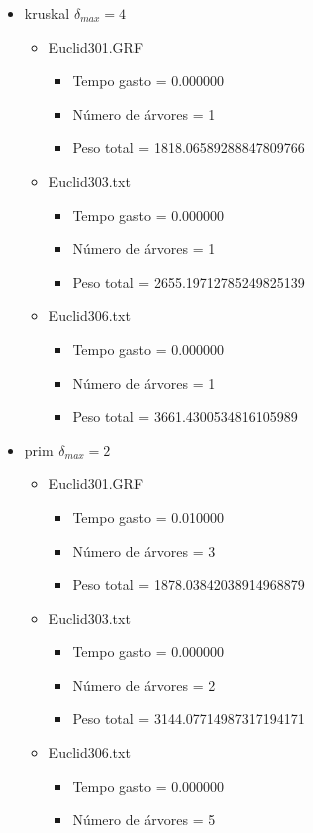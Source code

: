 \begin{itemize}
\begin{itemize}
\begin{itemize}
\end{itemize}
\end{itemize}
\item kruskal $\delta_{max}=4$
\begin{itemize}
\item Euclid301.GRF
\begin{itemize}
\item Tempo gasto = 0.000000
\item Número de árvores = 1
\item Peso total = 1818.06589288847809766
\end{itemize}
\item Euclid303.txt
\begin{itemize}
\item Tempo gasto = 0.000000
\item Número de árvores = 1
\item Peso total = 2655.19712785249825139
\end{itemize}
\item Euclid306.txt
\begin{itemize}
\item Tempo gasto = 0.000000
\item Número de árvores = 1
\item Peso total = 3661.4300534816105989
\end{itemize}
\end{itemize}
\item prim $\delta_{max}=2$
\begin{itemize}
\item Euclid301.GRF
\begin{itemize}
\item Tempo gasto = 0.010000
\item Número de árvores = 3
\item Peso total = 1878.03842038914968879
\end{itemize}
\item Euclid303.txt
\begin{itemize}
\item Tempo gasto = 0.000000
\item Número de árvores = 2
\item Peso total = 3144.07714987317194171
\end{itemize}
\item Euclid306.txt
\begin{itemize}
\item Tempo gasto = 0.000000
\item Número de árvores = 5

\end{itemize}
\end{itemize}
\end{itemize}
